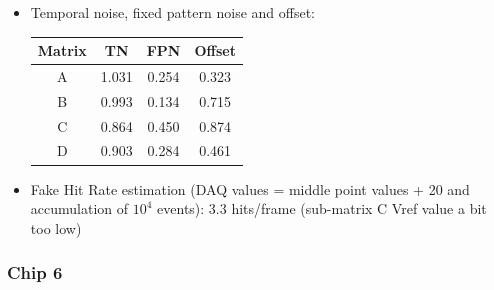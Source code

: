 \documentclass[a4papper, 10pt]{article}
\begin{document}
\begin{itemize}
          \item Temporal noise, fixed pattern noise and offset:

            \begin{center}
              \begin{tabular}{|c|c|c|c|}
                \hline %
         \rowcolor{light-gray}         Matrix  &  TN   &  FPN  &  Offset  \tabularnewline
                \hline %
                    A     & 1.031 & 0.254 & 0.323    \tabularnewline
                \hline %
                    B     & 0.993 &  0.134 & 0.715   \tabularnewline
                \hline %
                    C     & 0.864 &  0.450 & 0.874   \tabularnewline
                \hline %
                    D     & 0.903 & 0.284 & 0.461    \tabularnewline
                \hline %
              \end{tabular}
            \end{center}

        \item Fake Hit Rate estimation (DAQ values = middle point values + 20 and accumulation of $10^4$ events): 3.3 hits/frame (sub-matrix C Vref value a bit too low)
        
               
        \end{itemize}

        \subsubsection{Chip 6}
\end{document}
